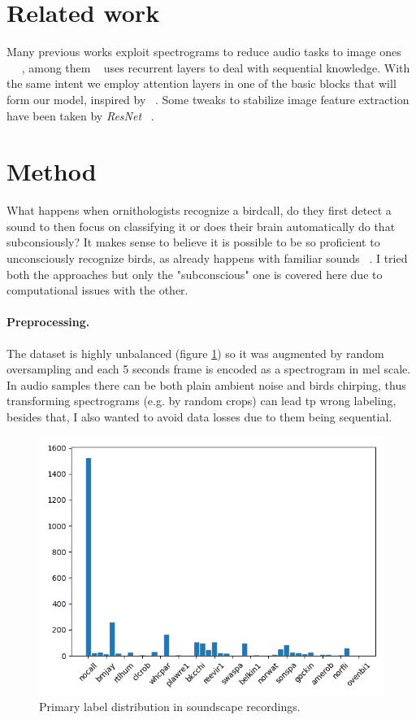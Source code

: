 \documentclass{article}
\begin{document}
\section{Related work}
Many previous works exploit spectrograms to reduce audio tasks to image ones ~\cite{hamdyaudio} ~\cite{michelashvili2020denoising} ~\cite{xie2021audio}, among them ~\cite{xie2021audio} uses recurrent layers to deal with sequential knowledge.
With the same intent we employ attention layers in one of the basic blocks that will form our model, inspired by ~\cite{zhang2020resnest}.
Some tweaks to stabilize image feature extraction have been taken by \textit{ResNet} ~\cite{he2016deep}.

\section{Method} \label{sec:method}
What happens when ornithologists recognize a birdcall, do they first detect a sound to then focus on classifying it or does their brain automatically do that subconsiously?
It makes sense to believe it is possible to be so proficient to unconsciously recognize birds, as already happens with familiar sounds ~\cite{kirmse2009familiarity}. 
I tried both the approaches but only the "subconscious" one is covered here due to computational issues with the other.

\paragraph*{Preprocessing.}
The dataset is highly unbalanced (figure \ref{fig:soundscapes_classification_freq}) 
so it was augmented by random oversampling and each 5 seconds frame is encoded as a spectrogram in mel scale.
In audio samples there can be both plain ambient noise and birds chirping, thus transforming spectrograms (e.g. by random crops) can lead tp wrong labeling, besides that, I also wanted to avoid data losses due to them being sequential.

\begin{figure}
    \centering
    \includegraphics[scale=.35]{images/soundscapes_distribution_birds.png}
    \caption{Primary label distribution in soundscape recordings.}
    \label{fig:soundscapes_classification_freq}
\end{figure}
\end{document}
